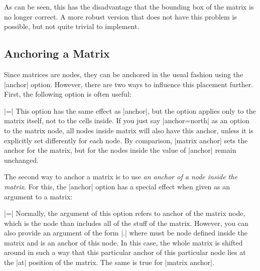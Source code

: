 As can be seen, this has the disadvantage that the bounding box of the
matrix is no longer correct. A more robust version that does not have
this problem is possible, but not quite trivial to implement.


\subsection{Anchoring a Matrix}

Since matrices are nodes, they can be anchored in the usual fashion
using the |anchor| option. However, there are two ways to influence
this placement further. First, the following option is often useful:

\begin{itemize}
  |=|
  This option has the same effect as |anchor|, but the option applies
  only to the matrix itself, not to the cells inside. If you just say
  |anchor=north| as an option to the matrix node, all nodes inside
  matrix will also have this anchor, unless it is explicitly set
  differently for each node. By comparison, |matrix anchor| sets the
  anchor for the matrix, but for the nodes inside the value of
  |anchor| remain unchanged.

\begin{codeexample}[]
\end{codeexample}
\end{itemize}

The second way to anchor a matrix is to use \emph{an anchor of a node
  inside the matrix}. For this, the |anchor| option has a special
effect when given as an argument to a matrix:

\begin{itemize}
  |=|
  Normally, the argument of this option refers to anchor of the matrix
  node, which is the node than includes all of the stuff of the
  matrix. However, you can also provide an argument of the form
  |.| where  must be node defined
  inside the matrix and  is an anchor of this node. In
  this case, the whole matrix is shifted around in such a way that
  this particular anchor of this particular node lies at the |at|
  position of the matrix. The same is true for |matrix anchor|.
\end{itemize}

